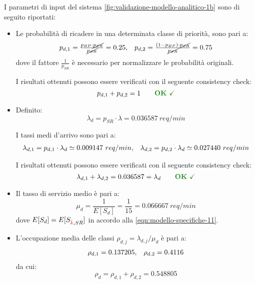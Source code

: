 I parametri di input del sistema \ref{fig:validazione-modello-analitico-1b} sono di seguito riportati:
\begin{itemize}
\item Le probabilità di ricadere in una determinata classe di priorità, sono pari a:
\begin{equation}
\begin{array}{l l}
p_{d,1} = \frac{p_{BP} \cdot \cancel{p_{SR}}}{\cancel{p_{SR}}} = 0.25, & p_{d,2} = \frac{(1-p_{BP}) \cdot \cancel{p_{SR}}}{\cancel{p_{SR}}} = 0.75
\end{array}
\end{equation}
dove il fattore $\frac{1}{p_{SR}}$ è necessario per normalizzare le probabilità originali.

I risultati ottenuti possono essere verificati con il seguente consistency check:
\begin{equation}
p_{d,1} + p_{d,2}  = 1 \qquad \text{\color{forestgreen}\textbf{OK} \checkmark}
\end{equation}
\item Definito:
\begin{equation}
\lambda_d = p_{SR}\cdot \lambda = 0.036587\ req/min
\end{equation} 

I tassi medi d'arrivo sono pari a:
\begin{equation}
\begin{array}{l l}
\lambda_{d,1} = p_{d,1} \cdot \lambda_d \simeq 0.009147\ req/min, & \lambda_{d,2} = p_{d,2} \cdot \lambda_d \simeq 0.027440\ req/min
\end{array}
\end{equation}

I risultati ottenuti possono essere verificati con il seguente consistency check:
\begin{equation}
\lambda_{d,1} + \lambda_{d,2} = 0.036587 = \lambda_d \qquad \text{\color{forestgreen}\textbf{OK} \checkmark}
\end{equation}

\item Il tasso di servizio medio è pari a:
\begin{equation}
\mu_d = \frac{1}{E[S_d]} = \frac{1}{15} = 0.066667\ req/min
\end{equation}
dove $E[S_d] = E[S_{{\color{red}\hat{k}}{}, SR}]$ in accordo alla \ref{eqn:modello-specifiche-11}.

\item L'occupazione media delle classi $\rho_{d,j} = \lambda_{d,j}/\mu_d$ è pari a:
\begin{equation}
\begin{array}{l l}
\rho_{d,1} = 0.137205, & \rho_{d,2} = 0.4116
\end{array}
\end{equation}
da cui:
\begin{equation}
\rho_d = \rho_{d,1} + \rho_{d,2} = 0.548805
\end{equation}
\end{itemize}


